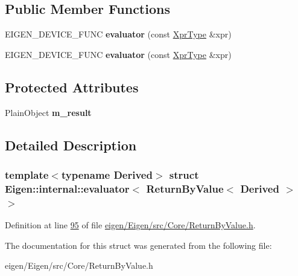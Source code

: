 \subsection*{Public Member Functions}
\begin{DoxyCompactItemize}
\item 
\mbox{\label{struct_eigen_1_1internal_1_1evaluator_3_01_return_by_value_3_01_derived_01_4_01_4_aa2c9c15935bfab4db256de0f0c78679b}} 
E\+I\+G\+E\+N\+\_\+\+D\+E\+V\+I\+C\+E\+\_\+\+F\+U\+NC {\bfseries evaluator} (const \hyperlink{group___core___module_class_eigen_1_1_return_by_value}{Xpr\+Type} \&xpr)
\item 
\mbox{\label{struct_eigen_1_1internal_1_1evaluator_3_01_return_by_value_3_01_derived_01_4_01_4_aa2c9c15935bfab4db256de0f0c78679b}} 
E\+I\+G\+E\+N\+\_\+\+D\+E\+V\+I\+C\+E\+\_\+\+F\+U\+NC {\bfseries evaluator} (const \hyperlink{group___core___module_class_eigen_1_1_return_by_value}{Xpr\+Type} \&xpr)
\end{DoxyCompactItemize}
\subsection*{Protected Attributes}
\begin{DoxyCompactItemize}
\item 
\mbox{\label{struct_eigen_1_1internal_1_1evaluator_3_01_return_by_value_3_01_derived_01_4_01_4_abc40dbe3721e9fc75fa633f67d58f1c2}} 
Plain\+Object {\bfseries m\+\_\+result}
\end{DoxyCompactItemize}


\subsection{Detailed Description}
\subsubsection*{template$<$typename Derived$>$\newline
struct Eigen\+::internal\+::evaluator$<$ Return\+By\+Value$<$ Derived $>$ $>$}



Definition at line \hyperlink{eigen_2_eigen_2src_2_core_2_return_by_value_8h_source_l00095}{95} of file \hyperlink{eigen_2_eigen_2src_2_core_2_return_by_value_8h_source}{eigen/\+Eigen/src/\+Core/\+Return\+By\+Value.\+h}.



The documentation for this struct was generated from the following file\+:\begin{DoxyCompactItemize}
\item 
eigen/\+Eigen/src/\+Core/\+Return\+By\+Value.\+h\end{DoxyCompactItemize}
